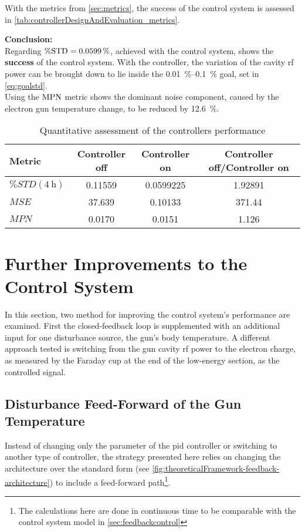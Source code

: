With the metrics from \autoref{sec:metrics}, the success of the control system is assessed in \autoref{tab:controllerDesignAndEvaluation_metrics}.

\textbf{Conclusion:}\\
Regarding $\operatorname{\%STD}=\SI{0.0599}{\percent}$, achieved with the control system, shows the \textbf{success} of the control system. With the controller, the variation of the cavity \gls{rf} power can be brought down to lie inside the \SIrange{0.01}{0.1}{\percent} goal, set in \autoref{eq:goalstd}.\\
Using the $\operatorname{MPN}$ metric shows the dominant noise component, caused by the electron gun temperature change, to be reduced by \SI{12.6}{\percent}.

\begin{table}[tbh]
\centering
\caption{Quantitative assessment of the controllers performance}\label{tab:controllerDesignAndEvaluation_metrics}
\begin{tabular}{lSSS}
	\toprule
	Metric                 & {Controller off} & {Controller on} & {Controller off/Controller on} \\ \midrule
	$\%STD(\SI{4}{\hour})$ & 0.11559          & 0.0599225       & 1.92891                        \\
	$MSE$                  & 37.639           & 0.10133         & 371.44                         \\
	$MPN$                  & 0.0170           & 0.0151          & 1.126                          \\ \bottomrule
\end{tabular}
\end{table}

\section{Further Improvements to the Control System}
In this section, two method for improving the control system's performance are examined. First the closed-feedback loop is supplemented with an additional input for one disturbance source, the gun's body temperature. A different approach tested is switching from the gun cavity \gls{rf} power to the electron charge, as measured by the Faraday cup at the end of the low-energy section, as the controlled signal.

\subsection{Disturbance Feed-Forward of the Gun Temperature}
Instead of changing only the parameter of the \gls{pid} controller or switching to another type of controller, the strategy presented here relies on changing the architecture over the standard form (see \autoref{fig:theoreticalFramework-feedback-architecture}) to include a feed-forward path\footnote{The calculations here are done in continuous time to be comparable with the control system model in \autoref{sec:feedbackcontrol}}.

